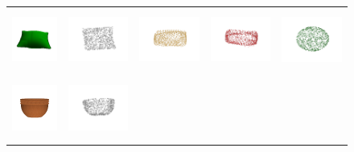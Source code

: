 \documentclass[bachelor, nocolorlinks, printoneside]{seuthesis} %
\begin{document}
\begin{Appendix}{}
\begin{figure}[!h]
\begin{tabular}{c@{}c@{}c@{}c@{}c@{}}
            \vspace{-5mm}
            \includegraphics[width=0.12\columnwidth,height=2cm]{figs/supp_real_dataset/Image/pillow_68131b4f51579263f7b57f419ab2620.png} &
            \includegraphics[width=0.18\columnwidth,height=2cm]{figs/supp_real_dataset/GT/pillow_68131b4f51579263f7b57f419ab2620_gt.png} &
            \includegraphics[width=0.18\columnwidth,height=2cm]{figs/supp_real_dataset/AE_label/pillow_68131b4f51579263f7b57f419ab2620_pred.png} &
            \includegraphics[width=0.18\columnwidth,height=2cm]{figs/supp_real_dataset/AE/pillow_68131b4f51579263f7b57f419ab2620_pred.png} &
            \includegraphics[width=0.18\columnwidth,height=2cm]{figs/supp_real_dataset/oracle/pillow_68131b4f51579263f7b57f419ab2620_oracle.png} \\
            \vspace{-5mm}
            \includegraphics[width=0.11\columnwidth,height=2cm]{figs/supp_real_dataset/Image/pot_490e2e25da735cfd3df324363ca0723f.png} &
            \includegraphics[width=0.18\columnwidth,height=2cm]{figs/supp_real_dataset/GT/pot_490e2e25da735cfd3df324363ca0723f_gt.png} &

\end{tabular}
\end{figure}
\end{Appendix}
\end{document}
